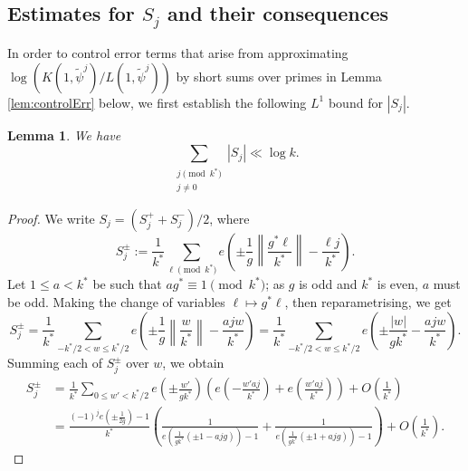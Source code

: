 \documentclass[10pt]{amsart}
\newtheorem{lem}[thm]{Lemma}
\theoremstyle{definition}
\renewcommand{\ss}{\substack}
\begin{document}
\subsection{Estimates for $S_j$ and their consequences}
In order to control error terms that arise from approximating $\log(K(1,\tilde{\psi}^j)/L(1,\tilde{\psi}^j))$ by short sums over primes in Lemma \ref{lem:controlErr} below, we first establish the following $L^1$ bound for $|S_j|$.
\begin{lem} \label{lem:SjBds}
We have
$$
\sum_{\ss{j \pmod{k^\ast} \\ j \neq 0}} |S_j| \ll \log k.
$$
\end{lem}
\begin{proof}
We write $S_j = (S_j^+ + S_j^-)/2$, where
$$
S_j^{\pm} := \frac{1}{k^\ast} \sum_{\ell \pmod{k^\ast}} e\left(\pm \frac{1}{g} \left\| \frac{g^\ast\ell}{k^\ast}\right\| - \frac{\ell j}{k^\ast}\right).
$$
Let $1 \leq a < k^\ast$ be such that $ag^\ast \equiv 1 \pmod{k^\ast}$; as $g$ is odd and $k^\ast$ is even, $a$ must be odd. Making the change of variables $\ell \mapsto g^\ast \ell$, then reparametrising, we get 
$$
S_j^{\pm} = \frac{1}{k^\ast} \sum_{-k^\ast/2 < w \leq k^\ast/2} e\left(\pm \frac{1}{g} \left\|\frac{w}{k^\ast}\right\| - \frac{a jw}{k^\ast}\right) = \frac{1}{k^\ast} \sum_{-k^\ast/2 < w \leq k^\ast/2} e\left(\pm \frac{|w|}{gk^\ast} - \frac{a j w}{k^\ast}\right).
$$
Summing each of $S_j^\pm$ over $w$, we obtain
\begin{align*}
S_j^\pm  &= \frac{1}{k^\ast} \sum_{0 \leq w' < k^\ast/2} e\left(\pm \frac{w'}{gk^\ast}\right)\left(e\left(- \frac{w'aj}{k^\ast}\right) + e\left(\frac{w'aj}{k^\ast}\right)\right) + O\left(\frac{1}{k^\ast}\right)\\
&= \frac{(-1)^j e(\pm \tfrac{1}{2g})-1}{k^\ast} \left(\frac{1}{e(\tfrac{1}{gk^\ast}(\pm 1- ajg)) - 1} + \frac{1}{e(\tfrac{1}{gk^\ast}(\pm 1+ ajg)) - 1}\right) + O\left(\frac{1}{k^\ast}\right).

\end{align*}
\end{proof}
\end{document}
